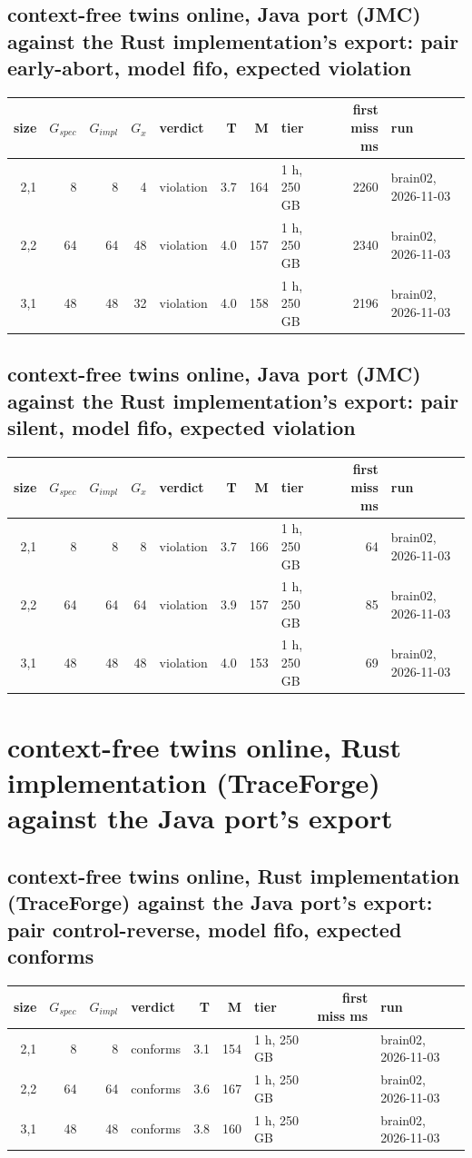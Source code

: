 \documentclass[10pt]{article}
\begin{document}
\subsection*{context-free twins online, Java port (JMC) against the Rust implementation's export: pair \textsf{early-abort}, model fifo, expected violation}
\begin{longtable}{@{}rrrrlrrlrl@{}}
\toprule
size & $G_{\mathit{spec}}$ & $G_{\mathit{impl}}$ & $G_x$ & verdict & T & M & tier & first miss ms & run \\
\midrule
\endhead
\color{red} 2,1 & 8 & 8 & 4 & violation & 3.7 & 164 & 1 h, 250 GB & 2260 & brain02, 2026-11-03 \\
\color{red} 2,2 & 64 & 64 & 48 & violation & 4.0 & 157 & 1 h, 250 GB & 2340 & brain02, 2026-11-03 \\
\color{red} 3,1 & 48 & 48 & 32 & violation & 4.0 & 158 & 1 h, 250 GB & 2196 & brain02, 2026-11-03 \\
\bottomrule
\end{longtable}
\subsection*{context-free twins online, Java port (JMC) against the Rust implementation's export: pair \textsf{silent}, model fifo, expected violation}
\begin{longtable}{@{}rrrrlrrlrl@{}}
\toprule
size & $G_{\mathit{spec}}$ & $G_{\mathit{impl}}$ & $G_x$ & verdict & T & M & tier & first miss ms & run \\
\midrule
\endhead
\color{red} 2,1 & 8 & 8 & 8 & violation & 3.7 & 166 & 1 h, 250 GB & 64 & brain02, 2026-11-03 \\
\color{red} 2,2 & 64 & 64 & 64 & violation & 3.9 & 157 & 1 h, 250 GB & 85 & brain02, 2026-11-03 \\
\color{red} 3,1 & 48 & 48 & 48 & violation & 4.0 & 153 & 1 h, 250 GB & 69 & brain02, 2026-11-03 \\
\bottomrule
\end{longtable}
\section*{context-free twins online, Rust implementation (TraceForge) against the Java port's export}
\subsection*{context-free twins online, Rust implementation (TraceForge) against the Java port's export: pair \textsf{control-reverse}, model fifo, expected conforms}
\begin{longtable}{@{}rrrlrrlrl@{}}
\toprule
size & $G_{\mathit{spec}}$ & $G_{\mathit{impl}}$ & verdict & T & M & tier & first miss ms & run \\
\midrule
\endhead
\color{red} 2,1 & 8 & 8 & conforms & 3.1 & 154 & 1 h, 250 GB &  & brain02, 2026-11-03 \\
\color{red} 2,2 & 64 & 64 & conforms & 3.6 & 167 & 1 h, 250 GB &  & brain02, 2026-11-03 \\
\color{red} 3,1 & 48 & 48 & conforms & 3.8 & 160 & 1 h, 250 GB &  & brain02, 2026-11-03 \\
\bottomrule
\end{longtable}
\end{document}
